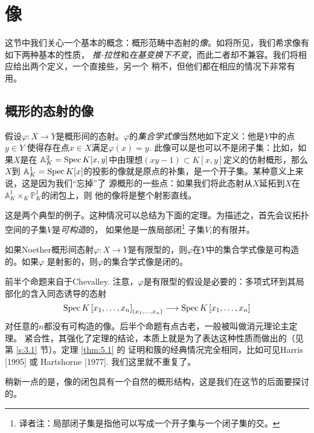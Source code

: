 \section{像}\label{s:4.1}


这节中我们关心一个基本的概念：概形范畴中态射的\textit{像}。如将所见，我们希求像有如下两种基本的性质，
\textit{推-拉性}和\textit{在基变换下不变}，而此二者却不兼容。我们将相应给出两个定义，一个直接些，另一个
稍不，但他们都在相应的情况下非常有用。

\subsection{概形的态射的像}\label{s:4.1.1}

假设$\varphi:X\to Y$是概形间的态射。$\varphi$的\textit{集合学式像}当然地如下定义：他是$Y$中的点$y\in Y$
使得存在点$x\in X$满足$\varphi(x)=y$. 此像可以是也可以不是闭子集：比如，如果$X$是在
$\mathbb{A}_K^2=\operatorname{Spec} K[x, y]$中由理想$(xy-1)\subset K[x,y]$定义的仿射概形，那么$X$到
$\mathbb{A}_K^1=\operatorname{Spec} K[x]$的投影的像就是原点的补集，是一个开子集。某种意义上来说，这是因为我们“忘掉”了
源概形的一些点：如果我们将此态射从$X$延拓到$X$在$\mathbb{A}_K^1 \times_K \mathbb{P}_K^1$的闭包上，则
他的像将是整个射影直线。

这是两个典型的例子。这种情况可以总结为下面的定理。为描述之，首先会议拓扑空间的子集$V$是\textit{可构造}的，
如果他是一族局部闭\footnote{译者注：局部闭子集是指他可以写成一个开子集与一个闭子集的交。}%
子集$V_i$的有限并。


\begin{thm}\label{thm:5.1}
    如果Noether概形间态射$\varphi: X\to Y$是有限型的，则$\varphi$在$Y$中的集合学式像是可构造的。如果$\varphi$
    是射影的，则$\varphi$的集合学式像是闭的。
\end{thm}

前半个命题来自于Chevalley. 注意，$\varphi$是有限型的假设是必要的：多项式环到其局部化的含入同态诱导的态射
\[
    \operatorname{Spec} K\left[x_1, \ldots, x_n\right]_{\left(x_1, \ldots, x_n\right)} \longrightarrow 
    \operatorname{Spec} K\left[x_1, \ldots, x_n\right]
\]
对任意的$n$都没有可构造的像。后半个命题有点古老，一般被叫做消元理论主定理。
紧合性，其强化了定理的结论，本质上就是为了表达这种性质而做出的（见第 \ref{s:3.1} 节）。定理 \ref{thm:5.1} 的
证明和簇的经典情况完全相同，比如可见Harris [1995] 或 Hartshorne [1977]. 我们这里就不重复了。

稍新一点的是，像的闭包具有一个自然的概形结构，这是我们在这节的后面要探讨的。

